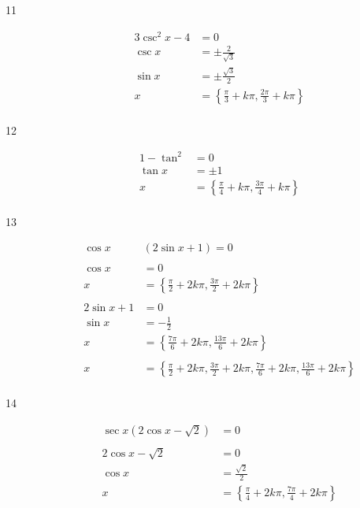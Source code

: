 \documentclass{exam}
\begin{document}
\begin{description}
      \item[11] 
        \begin{align*}
          3 \csc^2 x - 4 & = 0 \\
          \csc x         & = \pm \frac{2}{\sqrt{3}} \\
          \sin x         & = \pm \frac{\sqrt{3}}{2} \\
          x              & = \boxed{ \left\{ \frac{\pi}{3} + k \pi, \frac{2 \pi}{3} + k \pi \right\} } \\
        \end{align*}

      \item[12] 
        \begin{align*}
          1 - \tan^2 & = 0 \\
          \tan x         & = \pm 1 \\
          x              & = \boxed{ \left\{ \frac{\pi}{4} + k \pi, \frac{3 \pi}{4} + k \pi \right\} } \\
        \end{align*}

      \item[13] 
        \begin{align*}
          \cos x & (2 \sin x + 1) = 0 \\
          \\
          \cos x & = 0 \\
          x      & = \left\{ \frac{\pi}{2} + 2k \pi, \frac{3 \pi}{2} + 2k \pi \right\} \\
          \\
          2 \sin x + 1 & = 0 \\
          \sin x       & = - \frac{1}{2} \\
          x            & = \left\{ \frac{7 \pi}{6} + 2k \pi, \frac{13 \pi}{6} + 2k \pi \right\} \\
          \\
          x & = \boxed{ \left\{ \frac{\pi}{2} + 2k \pi, \frac{3 \pi}{2} + 2k \pi,
                        \frac{7 \pi}{6} + 2k \pi, \frac{13 \pi}{6} + 2k \pi \right\} } \\
        \end{align*}

      \item[14] 
        \begin{align*}
          \sec x (2 \cos x - \sqrt{2}) & = 0 \\
          \\
          2 \cos x - \sqrt{2} & = 0 \\
          \cos x              & = \frac{\sqrt{2}}{2} \\
          x                   & = \boxed{ \left\{ \frac{\pi}{4} + 2 k \pi, \frac{7 \pi}{4} + 2 k \pi \right\} } \\
        \end{align*}


\end{description}
\end{document}
